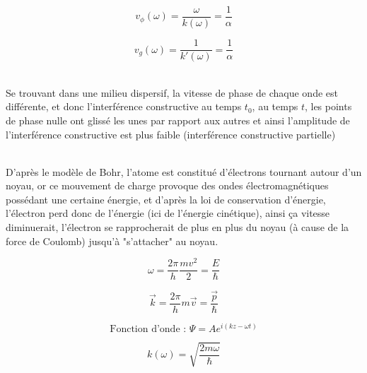 \documentclass	[11pt, a4paper, openany]{book}
\begin{document}
		$$ v_{\phi}(\omega) = \dfrac{\omega}{k(\omega)} = \dfrac{1}{\alpha} $$
		
		$$ v_g(\omega) = \dfrac{1}{k'(\omega)} = \dfrac{1}{\alpha} $$
		
		\ \\ Se trouvant dans une milieu dispersif, la vitesse de phase de chaque onde est différente, et donc l'interférence constructive au temps $t_0$, au temps $t$, les points de phase nulle ont glissé les unes par rapport aux autres et ainsi l'amplitude de l'interférence constructive est plus faible (interférence constructive partielle)
		\vspace{1cm}
		
		\ \\ D'après le modèle de Bohr, l'atome est constitué d'électrons tournant autour d'un noyau, or ce mouvement de charge provoque des ondes électromagnétiques possédant une certaine énergie, et d'après la loi de conservation d'énergie, l'électron perd donc de l'énergie (ici de l'énergie cinétique), ainsi ça vitesse diminuerait, l'électron se rapprocherait de plus en plus du noyau (à cause de la force de Coulomb) jusqu'à "s'attacher" au noyau.
		\vspace{1cm}
		
		
		
		$$ \omega = \dfrac{2\pi}{h}\dfrac{mv^2}{2} = \dfrac{E}{\hbar} $$
		
		$$ \vec k = \dfrac{2\pi}{h}m\vec v = \dfrac{\vec p}{\hbar} $$
		
		$$ \text{Fonction d'onde : } \Psi = Ae^{i(kz-\omega t)} $$
		
		
		$$ k(\omega) = \sqrt{\dfrac{2m\omega}{\hbar}} $$
		
\end{document}
